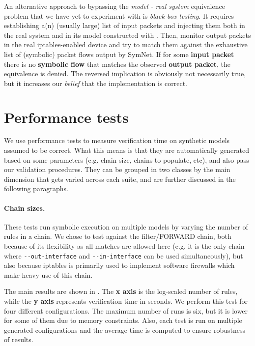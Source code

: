An alternative approach to bypassing the \emph{model - real system} equivalence
problem that we have yet to experiment with is \emph{black-box testing}.  It
requires establishing a(n) (usually large) list of input packets and injecting
them both in the real system and in its model constructed with \TOOL.  Then,
monitor output packets in the real iptables-enabled device and try to match
them against the exhaustive list of (symbolic) packet flows output by SymNet.
If for some \textbf{input packet} there is no \textbf{symbolic flow} that
matches the observed \textbf{output packet}, the equivalence is denied.  The
reversed implication is obviously not necessarily true, but it increases our
\emph{belief} that the implementation is correct.


\section{Performance tests}

We use performance tests to measure verification time on synthetic models
assumed to be correct.  What this means is that they are automatically
generated based on some parameters (e.g. chain size, chains to populate, etc),
and also pass our validation procedures.  They can be grouped in two classes by
the main dimension that gets varied across each suite, and are further
discussed in the following paragraphs.

\paragraph{Chain sizes.} These tests run symbolic execution on multiple models
by varying the number of rules in a chain.  We chose to test against the
filter/FORWARD chain, both because of its flexibility as all matches are
allowed here (e.g.  it is the only chain where \lstinline{--out-interface} and
\lstinline{--in-interface} can be used simultaneously), but also because
iptables is primarily used to implement software firewalls which make heavy use
of this chain.

The main results are shown in .  The
\textbf{x axis} is the log-scaled number of rules, while the \textbf{y axis}
represents verification time in seconds.  We perform this test for four
different configurations.  The maximum number of runs is six, but it is lower
for some of them due to memory constraints.  Also, each test is run on multiple
generated configurations and the average time is computed to ensure robustness
of results.


